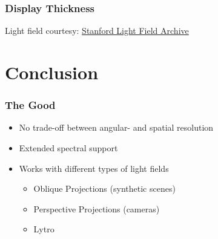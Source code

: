 \documentclass[12pt, compress]{beamer}
\begin{document}
\begin{frame}[fragile]
	\frametitle{Display Thickness}
	
	\begin{figure}
		\hspace{0.5cm}
	\end{figure}
	
	{\scriptsize Light field courtesy: \href{http://lightfield.stanford.edu/lfs.html}{Stanford Light Field Archive}}
\end{frame}

\section{Conclusion}

\begin{frame}[fragile]
	\frametitle{The Good}
	
	\begin{itemize}
		\item \alert<1>{No trade-off between angular- and spatial resolution}
		\item \alert<2>{Extended spectral support}
		\item \alert<3>{Works with different types of light fields}
		\begin{itemize}
			\item Oblique Projections (synthetic scenes)
			\item Perspective Projections (cameras)
			\item Lytro
		\end{itemize}
	\end{itemize}
\end{frame}
\end{document}
